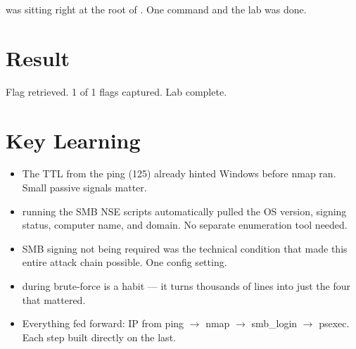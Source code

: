 \begin{whybox}
 was sitting right at the root of . One
command and the lab was done.



\section*{Result}

Flag retrieved. 1 of 1 flags captured. Lab complete.

\section*{Key Learning}

\begin{takebox}
\begin{itemize}
  \item The TTL from the ping (125) already hinted Windows before nmap ran.
        Small passive signals matter.
  \item {} running the SMB NSE scripts automatically pulled the OS
        version, signing status, computer name, and domain. No separate
        enumeration tool needed.
  \item SMB signing not being required was the technical condition that made this
        entire attack chain possible. One config setting.
  \item {} during brute-force is a habit --- it turns thousands
        of lines into just the four that mattered.
  \item Everything fed forward: IP from ping $\rightarrow$ nmap $\rightarrow$
        smb\_login $\rightarrow$ psexec. Each step built directly on the last.
\end{itemize}
\end{takebox}

\end{whybox}